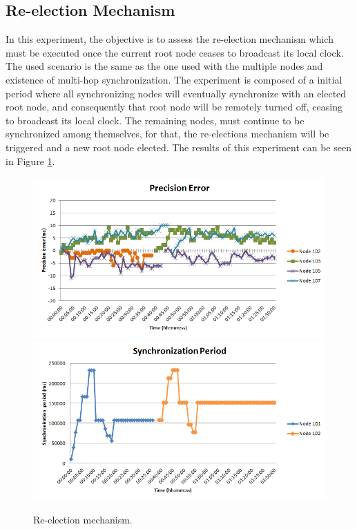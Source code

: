 \clearpage

\subsection{Re-election Mechanism}
In this experiment, the objective is to assess the re-election mechanism which must be executed once the current root node ceases to broadcast its local clock. The used scenario is the same as the one used with the multiple nodes and existence of multi-hop synchronization. The experiment is composed of a initial period where all synchronizing nodes will eventually synchronize with an elected root node, and consequently that root node will be remotely turned off, ceasing to broadcast its local clock. The remaining nodes, must continue to be synchronized among themselves, for that, the re-elections mechanism will be triggered and a new root node elected. The results of this experiment can be seen in Figure \ref{reelection}.

\begin{figure}[!htb]
\begin{center}
\includegraphics[scale=0.4]{./images/13-ttsp-10ms6nodes-reelection-error.png}
\includegraphics[scale=0.4]{./images/14-ttsp-10ms6nodes-reelection-period.png}
\end{center}
\caption{Re-election mechanism.}
\label{reelection}
\end{figure}

